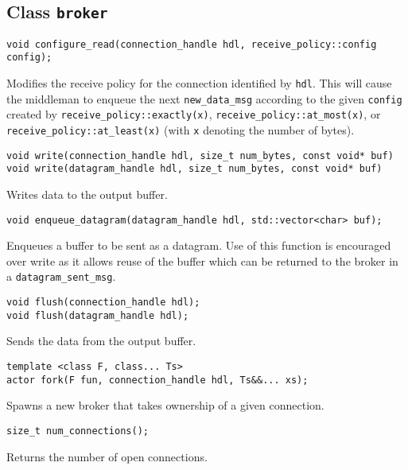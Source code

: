 \subsection{Class \lstinline^broker^}
\label{broker-class}

\begin{lstlisting}
void configure_read(connection_handle hdl, receive_policy::config config);
\end{lstlisting}

Modifies the receive policy for the connection identified by \lstinline^hdl^.
This will cause the middleman to enqueue the next \lstinline^new_data_msg^
according to the given \lstinline^config^ created by
\lstinline^receive_policy::exactly(x)^, \lstinline^receive_policy::at_most(x)^,
or \lstinline^receive_policy::at_least(x)^ (with \lstinline^x^ denoting the
number of bytes).

\begin{lstlisting}
void write(connection_handle hdl, size_t num_bytes, const void* buf)
void write(datagram_handle hdl, size_t num_bytes, const void* buf)
\end{lstlisting}

Writes data to the output buffer.

\begin{lstlisting}
void enqueue_datagram(datagram_handle hdl, std::vector<char> buf);
\end{lstlisting}

Enqueues a buffer to be sent as a datagram. Use of this function is encouraged
over write as it allows reuse of the buffer which can be returned to the broker
in a \lstinline^datagram_sent_msg^.

\begin{lstlisting}
void flush(connection_handle hdl);
void flush(datagram_handle hdl);
\end{lstlisting}

Sends the data from the output buffer.

\begin{lstlisting}
template <class F, class... Ts>
actor fork(F fun, connection_handle hdl, Ts&&... xs);
\end{lstlisting}

Spawns a new broker that takes ownership of a given connection.

\begin{lstlisting}
size_t num_connections();
\end{lstlisting}

Returns the number of open connections.

